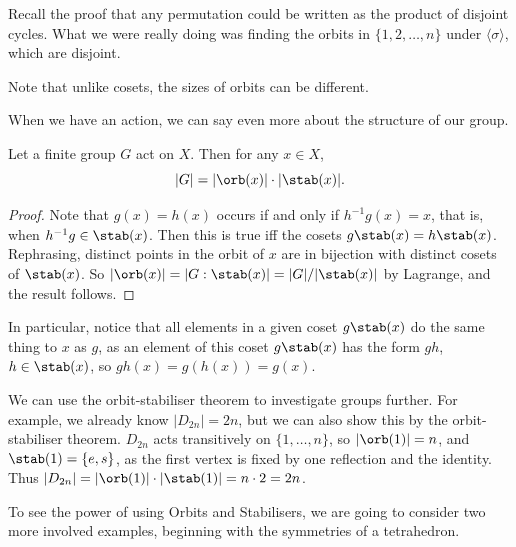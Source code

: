 Recall the proof that any permutation could be written as the product of disjoint cycles. What we were really doing was finding the orbits in $\{1, 2, \dots, n\}$ under $\langle \sigma \rangle$, which are disjoint.

\begin{remark}
	Note that unlike cosets, the sizes of orbits can be different.
\end{remark}

When we have an action, we can say even more about the structure of our group.

\begin{theorem}
	Let a finite group $G$ act on $X$. Then for any $x \in X$,
	$$
	|G| = |\orb(x)| \cdot |\stab(x)|.
	$$
\end{theorem}
\begin{proof}
	Note that $g(x) = h(x)$ occurs if and only if $h^{-1} g (x) = x$, that is, when $h^{-1} g \in \stab(x)$. Then this is true iff the cosets $g \stab(x) = h\stab(x)$. Rephrasing, distinct points in the orbit of $x$ are in bijection with distinct cosets of $\stab(x)$. So $|\orb(x)| = |G : \stab(x)| = |G| / |\stab(x) |$ by Lagrange, and the result follows.
\end{proof}

In particular, notice that all elements in a given coset $g \stab(x)$ do the same thing to $x$ as $g$, as an element of this coset $g\stab(x)$ has the form $gh$, $h \in \stab(x)$, so $gh(x) = g(h(x)) = g(x)$.

We can use the orbit-stabiliser theorem to investigate groups further. For example, we already know $|D_{2n}| = 2n$, but we can also show this by the orbit-stabiliser theorem. $D_{2n}$ acts transitively on $\{1, \dots, n\}$, so $|\orb(1)| = n$, and $\stab(1) = \{e, s\}$, as the first vertex is fixed by one reflection and the identity. Thus $|D_{2n}| = |\orb(1)| \cdot |\stab(1)| = n \cdot 2 = 2n$.



To see the power of using Orbits and Stabilisers, we are going to consider two more involved examples, beginning with the symmetries of a tetrahedron.

